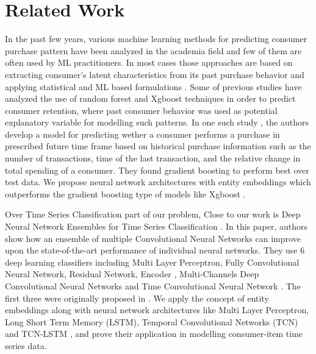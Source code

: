 \section{Related Work}
\label{sec:relatedwork}
In the past few years, various machine learning methods for predicting consumer purchase pattern have been analyzed in
the academia field and few of them are often used by ML practitioners. In most cases those approaches are based on extracting 
consumer's latent characteristics from its past purchase behavior and applying statistical and  
ML based formulations \cite{fader2009probability, choudhury2019machine}. 
Some of previous studies have analyzed the use of random forest and Xgboost techniques in order to predict 
consumer retention, where past consumer behavior was used as potential explanatory variable 
for modelling such patterns. In one such study \cite{martinez2020machine}, the authors develop a model for predicting wether a 
consumer performs a purchase in prescribed future time frame based on historical purchase information such as the number
of transactions, time of the last transaction, and the relative change in total spending of a consumer. 
They found gradient boosting to perform best over test data. We propose neural network architectures with entity embeddings
\cite{guo2016entity} which outperforms the gradient boosting type of models like Xgboost \cite{chen2016xgboost}. 

Over Time Series Classification part of our problem,
Close to our work is Deep Neural Network Ensembles for Time Series Classification \cite{fawaz2019deep}. 
In this paper, authors show how an ensemble of multiple Convolutional Neural Networks can improve upon the 
state-of-the-art performance of individual neural networks. They use 6 deep learning classifiers 
including Multi Layer Perceptron, Fully Convolutional Neural Network, Residual Network, 
Encoder \cite{serra2018towards}, Multi-Channels Deep Convolutional Neural Networks \cite{zheng2014time} and 
Time Convolutional Neural Network \cite{zhao2017convolutional}. The first three were originally proposed in \cite{wang2017time}. 
We apply the concept of entity embeddings \cite{guo2016entity} along with neural network architectures
like Multi Layer Perceptron, Long Short Term Memory (LSTM), Temporal Convolutional Networks (TCN) \cite{lea2016temporal} and 
TCN-LSTM \cite{karim2017lstm}, and prove their application in modelling consumer-item time series data.
